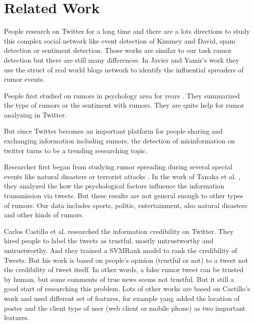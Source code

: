 \section{Related Work } %
People research on Twitter for a long time and there are a lots directions  to study this complex social network like event detection \cite{kimmey2015twitter} of Kimmey and David, spam detection \cite{ahmed2012mcl} \cite{wang2010don} or sentiment detection\cite{barbosa2010robust}. Those works are similar to our task rumor detection but there are  still many differences. In Javier and Yamir's work\cite{borge2012absence} they use the struct of real world blogs network to identify the influential spreaders of rumor events. 

People first studied on rumors in psychology area for years \cite{allport1947psychology} \cite{sunstein2014rumors}. They summarized the type of rumors or the sentiment with rumors. They are quite help for rumor analyzing in Twitter. 

But since Twitter becomes an important platform for people sharing and exchanging information including rumors, the detection of misinformation on twitter turns to be a trending researching topic. 

Researcher first began from studying rumor spreading during several special events like natural disasters\cite{oh2010exploration} \cite{tanaka2012transmission}\cite{mendoza2010twitter}  or terrorist attacks \cite{starbird2014rumors}. In the work of Tanaka et al.  \cite{tanaka2012transmission}, they analyzed the how the psychological factors influence the information transmission via tweets.  But these results are not general enough to other types of rumors. Our data includes sports, politic, entertainment, also natural disasters and other kinds of rumors. 

Carlos Castillo et al. researched the information credibility on Twitter\cite{castillo2011information}\cite{gupta2014tweetcred}. They hired people to label the tweets as trustful, mostly untrustworthy and untrustworthy. And they trained a SVMRank model to rank the credibility of Tweets.  But his work is based on people's opinion (trustful or not) to a tweet not the credibility of tweet itself. In other words, a false rumor tweet can be trusted by human, but some comments of true news seems not trustful. But it still a good start of researching this problem. Lots of other works are based on Castillo's work \cite{yang2012automatic} \cite{liu2015real} and used different set of features, for example yang \cite{yang2012automatic} added the location of poster and the client type of user (web client or mobile phone) as two important features.

